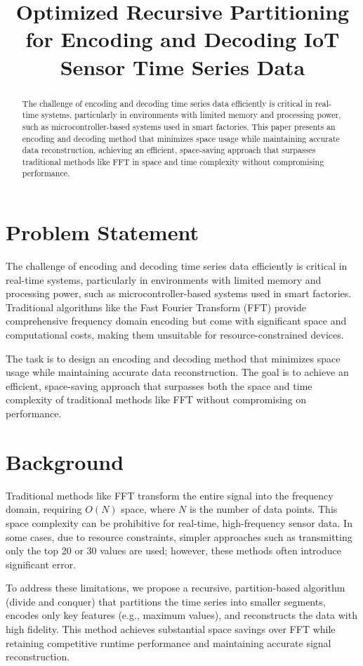 \documentclass[conference]{IEEEtran}
\title{Optimized Recursive Partitioning for Encoding and Decoding IoT Sensor Time Series Data}
\author{\IEEEauthorblockN{Haris Ghafoor}
\IEEEauthorblockA{
    Department of Computational Science and Engineering \\
    Yonsei University, Seoul, Korea \\
    ghafoorharis@yonsei.ac.kr
}
}
\begin{document}
\maketitle

\begin{abstract}
The challenge of encoding and decoding time series data efficiently is critical in real-time systems, particularly in environments with limited memory and processing power, such as microcontroller-based systems used in smart factories. This paper presents an encoding and decoding method that minimizes space usage while maintaining accurate data reconstruction, achieving an efficient, space-saving approach that surpasses traditional methods like FFT in space and time complexity without compromising performance.
\end{abstract}

\section{Problem Statement}
The challenge of encoding and decoding time series data efficiently is critical in real-time systems, particularly in environments with limited memory and processing power, such as microcontroller-based systems used in smart factories. Traditional algorithms like the Fast Fourier Transform (FFT) provide comprehensive frequency domain encoding but come with significant space and computational costs, making them unsuitable for resource-constrained devices.

The task is to design an encoding and decoding method that minimizes space usage while maintaining accurate data reconstruction. The goal is to achieve an efficient, space-saving approach that surpasses both the space and time complexity of traditional methods like FFT without compromising on performance.

\section{Background}
Traditional methods like FFT transform the entire signal into the frequency domain, requiring \( O(N) \) space, where \( N \) is the number of data points. This space complexity can be prohibitive for real-time, high-frequency sensor data. In some cases, due to resource constraints, simpler approaches such as transmitting only the top 20 or 30 values are used; however, these methods often introduce significant error.

To address these limitations, we propose a recursive, partition-based algorithm (divide and conquer) that partitions the time series into smaller segments, encodes only key features (e.g., maximum values), and reconstructs the data with high fidelity. This method achieves substantial space savings over FFT while retaining competitive runtime performance and maintaining accurate signal reconstruction.
\end{document}
